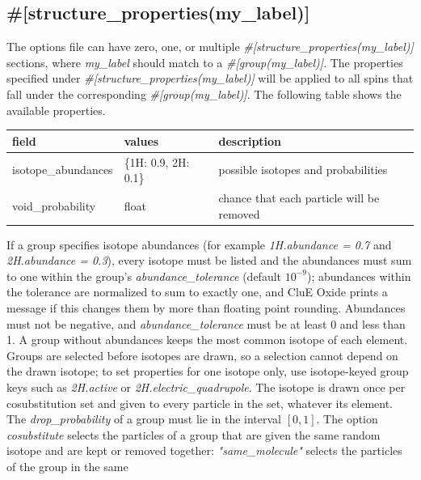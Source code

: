 \documentclass{book}
\begin{document}
\subsection{\#[structure\_properties(my\_label)]}
The options file can have zero, one, or multiple 
\textit{\#[structure\_properties(my\_label)]} sections,
where \textit{my\_label} should match to a 
\textit{\#[group(my\_label)]}.
The properties specified under  
\textit{\#[structure\_properties(my\_label)]} will be applied
to all spins that fall under the corresponding
\textit{\#[group(my\_label)]}.
The following table shows the available properties.
\begin{center}
\begin{tabular}{| m{20em} | m{1.5cm}| m{7cm} |}
 \hline 
 \textbf{field} & \textbf{values} & \textbf{description} \\ 
 \hline 
 isotope\_abundances & \{1H: 0.9, 2H: 0.1\} & possible isotopes and
 probabilities\\
 \hline 
 void\_probability & float & chance that each particle will be removed\\
 \hline 
\end{tabular}
\end{center} 
If a group specifies isotope abundances (for example 
\textit{1H.abundance = 0.7} and \textit{2H.abundance = 0.3}),
every isotope must be listed and the abundances must sum to one 
within the group's \textit{abundance\_tolerance} (default $10^{-9}$);
abundances within the tolerance are normalized to sum to exactly one,
and CluE Oxide prints a message if this changes them by more than 
floating point rounding.
Abundances must not be negative, and \textit{abundance\_tolerance} must be
at least 0 and less than 1.
A group without abundances keeps the most common isotope of each element.
Groups are selected before isotopes are drawn, so a selection cannot depend
on the drawn isotope; to set properties for one isotope only, use
isotope-keyed group keys such as \textit{2H.active} or
\textit{2H.electric\_quadrupole}.
The isotope is drawn once per cosubstitution set and given to every particle
in the set, whatever its element.
The \textit{drop\_probability} of a group must lie in the interval $[0,1]$.
The option \textit{cosubstitute} selects the particles of a group that 
are given the same random isotope and are kept or removed together:
\textit{"same\_molecule"} selects the particles of the group in the same
\end{document}
